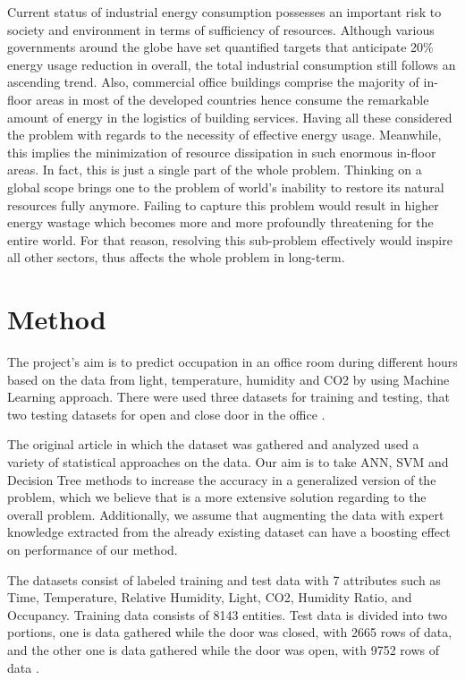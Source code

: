 \documentclass[conference]{IEEEtran}
\begin{document}
Current status
of industrial energy consumption possesses an important
risk to society and environment in terms of sufficiency of
resources. Although various governments around the
globe have set quantified targets that anticipate 20\%\cite{TargetCons} energy usage reduction in overall, the total industrial consumption still follows an ascending trend. Also, commercial office buildings comprise the majority of in-
floor areas in most of the developed countries hence consume the remarkable amount of energy in the logistics of building services. Having all these considered the problem with regards to the necessity of effective energy usage. Meanwhile, this implies the minimization of resource dissipation in such enormous in-floor areas. In fact, this is just a single part of the whole problem. Thinking on a global scope brings one to the problem of world’s inability to restore its natural resources fully anymore. Failing to capture this problem would result in higher energy wastage which becomes more and more profoundly threatening for the entire world. For that reason, resolving this sub-problem effectively would
inspire all other sectors, thus affects the whole problem in long-term.

\section{Method}
The project's aim is to predict occupation in an office room during different hours based on the data from light, temperature, humidity and CO2 by using Machine Learning approach. There were used three datasets for training and testing, that two testing datasets for open and close door in the office \cite{Candanedo}.


The original article in which the dataset was gathered and analyzed used a variety of statistical approaches on
the data. Our aim is to take ANN, SVM\cite{Erickson} and Decision Tree methods to increase the accuracy in a generalized version of the problem, which we believe that is a more extensive solution regarding to the overall problem.  Additionally, we assume that augmenting the data with expert knowledge extracted from the already existing dataset can have a boosting effect on performance of our method.

The datasets consist of labeled training and test data with 7 attributes such as Time, Temperature, Relative Humidity, Light, CO2, Humidity Ratio, and Occupancy. Training data consists of 8143 entities. Test data is divided into two portions, one is data gathered while the door was closed, with 2665 rows of data, and the other one is data gathered while the door was open, with 9752 rows of data \cite{Ryu}.
\end{document}
